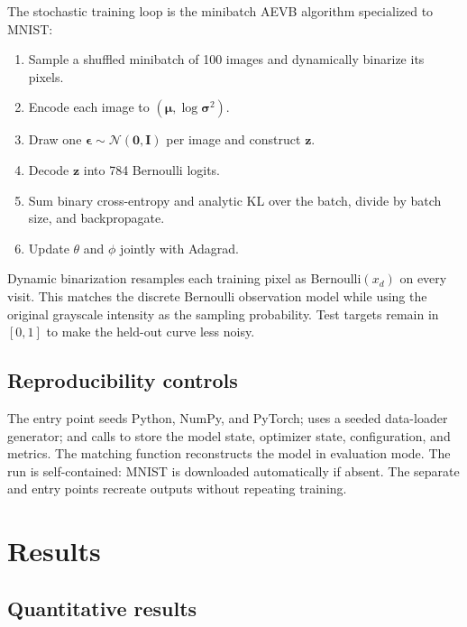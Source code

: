 \documentclass[11pt]{article}
\begin{document}
The stochastic training loop is the minibatch AEVB algorithm specialized to MNIST:

\begin{enumerate}
  \item Sample a shuffled minibatch of 100 images and dynamically binarize its pixels.
  \item Encode each image to $(\bm{\mu},\log\bm{\sigma}^2)$.
  \item Draw one $\bm{\epsilon}\sim\mathcal{N}(\bm{0},\bm{I})$ per image and construct $\bm{z}$.
  \item Decode $\bm{z}$ into 784 Bernoulli logits.
  \item Sum binary cross-entropy and analytic KL over the batch, divide by batch size, and backpropagate.
  \item Update $\theta$ and $\phi$ jointly with Adagrad.
\end{enumerate}

Dynamic binarization resamples each training pixel as Bernoulli$(x_d)$ on every visit. This matches the discrete Bernoulli observation model while using the original grayscale intensity as the sampling probability. Test targets remain in $[0,1]$ to make the held-out curve less noisy.

\subsection{Reproducibility controls}

The  entry point seeds Python, NumPy, and PyTorch; uses a seeded data-loader generator; and calls  to store the model state, optimizer state, configuration, and metrics. The matching  function reconstructs the model in evaluation mode. The run is self-contained: MNIST is downloaded automatically if absent. The separate  and  entry points recreate outputs without repeating training.

\section{Results}

\subsection{Quantitative results}
\end{document}
